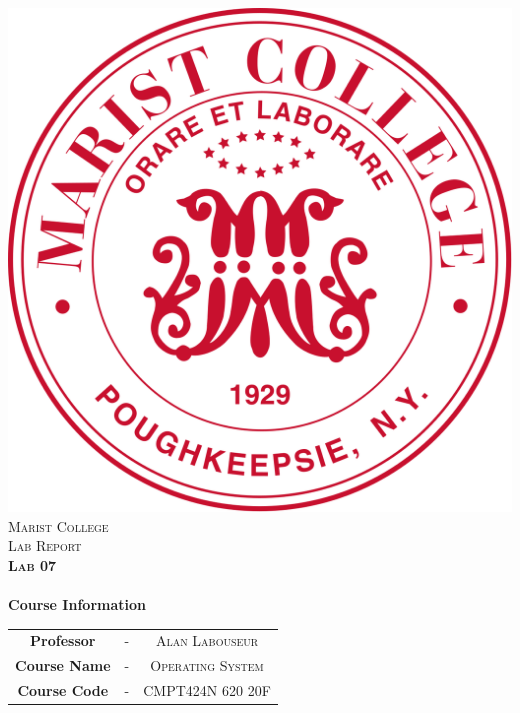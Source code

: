 \includegraphics[scale=0.15]{edit/logo.png}\\[1cm] %

\textsc{\LARGE Marist College}\\[1.5cm] %
\textsc{\Large Lab Report}\\[0.5cm]
\textsc{\Large \textbf{Lab 07}}\\[0.5cm]

\HRule \\[0.6cm]
{\Large\bfseries Course Information}\\[0.4cm] %
\begin{tabular}{c c c}
\large{\bfseries Professor} & - & \large{\textsc{Alan Labouseur}}\\ %
\large{\bfseries Course Name} & - & \large{\textsc{Operating System}}\\ %
\large{\bfseries Course Code} & - & \large{\textsc{CMPT424N 620 20F}}\\[7mm] %
\end{tabular}
\HRule \\[1.5cm]
